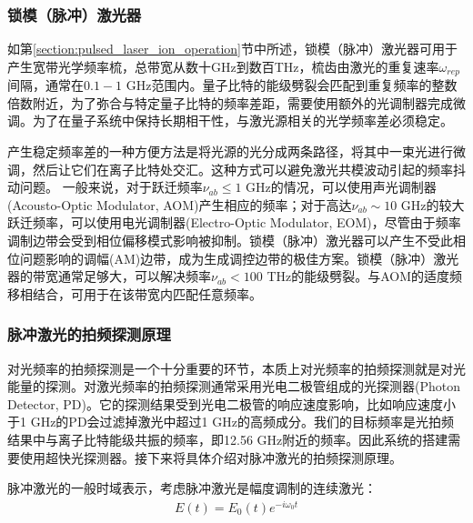 \subsubsection[锁模（脉冲）激光器]{锁模（脉冲）激光器}
如第\ref{section:pulsed_laser_ion_operation}节中所述，锁模（脉冲）激光器可用于产生宽带光学频率梳，总带宽从数十GHz到数百THz，梳齿由激光的重复速率$\omega_{rep}$间隔，通常在$0.1-1 $ GHz范围内。量子比特的能级劈裂会匹配到重复频率的整数倍数附近，为了弥合与特定量子比特的频率差距，需要使用额外的光调制器完成微调\cite[]{Hayes_Matsukevich_Maunz_Hucul_Quraishi_Olmschenk_Campbell_Mizrahi_Senko_Monroe_2010}。为了在量子系统中保持长期相干性，与激光源相关的光学频率差必须稳定\cite[]{Stick_Hensinger_Olmschenk_Madsen_Schwab_Monroe_2006}。

产生稳定频率差的一种方便方法是将光源的光分成两条路径，将其中一束光进行微调，然后让它们在离子比特处交汇。这种方式可以避免激光共模波动引起的频率抖动问题\cite[]{Thomas_Hemmer_Ezekiel_Leiby_Picard_Willis_2002}。
一般来说，对于跃迁频率$\nu_{ab}\leq 1$ GHz的情况，可以使用声光调制器(Acousto-Optic Modulator, AOM)产生相应的频率；对于高达$\nu_{ab} \sim 10 $ GHz的较大跃迁频率，可以使用电光调制器(Electro-Optic Modulator, EOM)，尽管由于频率调制边带会受到相位偏移模式影响被抑制\cite[]{Lee_Blinov_Brickman_Deslauriers_Madsen_Miller_Moehring_Stick_Monroe_2003}。锁模（脉冲）激光器可以产生不受此相位问题影响的调幅(AM)边带，成为生成调控边带的极佳方案。锁模（脉冲）激光器的带宽通常足够大，可以解决频率$\nu_{ab} < 100 $ THz的能级劈裂。与AOM的适度频移相结合，可用于在该带宽内匹配任意频率。

\subsubsection[脉冲激光的拍频探测原理]{脉冲激光的拍频探测原理}
对光频率的拍频探测是一个十分重要的环节，本质上对光频率的拍频探测就是对光能量的探测。对激光频率的拍频探测通常采用光电二极管组成的光探测器(Photon Detector, PD)。它的探测结果受到光电二极管的响应速度影响，比如响应速度小于1 GHz的PD会过滤掉激光中超过1 GHz的高频成分。我们的目标频率是光拍频结果中与离子比特能级共振的频率，即12.56 GHz附近的频率。因此系统的搭建需要使用超快光探测器。接下来将具体介绍对脉冲激光的拍频探测原理。

脉冲激光的一般时域表示，考虑脉冲激光是幅度调制的连续激光：
\begin{align}
    E(t)=E_0 (t) e^{-i\omega_0 t}
\end{align}

